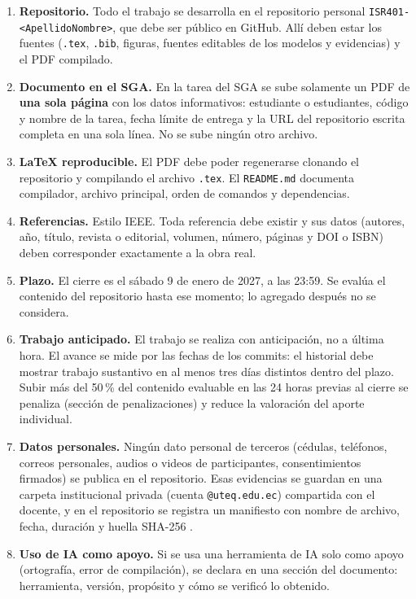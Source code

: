 \documentclass[11pt]{article}
\begin{document}
\begin{enumerate}[leftmargin=20pt,itemsep=3pt]
	\item \textbf{Repositorio.} Todo el trabajo se desarrolla en el repositorio personal \texttt{ISR401-<ApellidoNombre>}, que debe ser público en GitHub. Allí deben estar los fuentes (\texttt{.tex}, \texttt{.bib}, figuras, fuentes editables de los modelos y evidencias) y el PDF compilado.
	\item \textbf{Documento en el SGA.} En la tarea del SGA se sube solamente un PDF de \textbf{una sola página} con los datos informativos: estudiante o estudiantes, código y nombre de la tarea, fecha límite de entrega y la URL del repositorio escrita completa en una sola línea. No se sube ningún otro archivo.
	\item \textbf{\LaTeX{} reproducible.} El PDF debe poder regenerarse clonando el repositorio y compilando el archivo \texttt{.tex}. El \texttt{README.md} documenta compilador, archivo principal, orden de comandos y dependencias.
	\item \textbf{Referencias.} Estilo IEEE. Toda referencia debe existir y sus datos (autores, año, título, revista o editorial, volumen, número, páginas y DOI o ISBN) deben corresponder exactamente a la obra real.
	\item \textbf{Plazo.} El cierre es el sábado 9 de enero de 2027, a las 23:59. Se evalúa el contenido del repositorio hasta ese momento; lo agregado después no se considera.
	\item \textbf{Trabajo anticipado.} El trabajo se realiza con anticipación, no a última hora. El avance se mide por las fechas de los commits: el historial debe mostrar trabajo sustantivo en al menos tres días distintos dentro del plazo. Subir más del 50\,\% del contenido evaluable en las 24 horas previas al cierre se penaliza (sección de penalizaciones) y reduce la valoración del aporte individual.
	\item \textbf{Datos personales.} Ningún dato personal de terceros (cédulas, teléfonos, correos personales, audios o videos de participantes, consentimientos firmados) se publica en el repositorio. Esas evidencias se guardan en una carpeta institucional privada (cuenta \texttt{@uteq.edu.ec}) compartida con el docente, y en el repositorio se registra un manifiesto con nombre de archivo, fecha, duración y huella SHA-256 \citep{lopdp_2021}.
	\item \textbf{Uso de IA como apoyo.} Si se usa una herramienta de IA solo como apoyo (ortografía, error de compilación), se declara en una sección del documento: herramienta, versión, propósito y cómo se verificó lo obtenido.
\end{enumerate}
\end{document}

